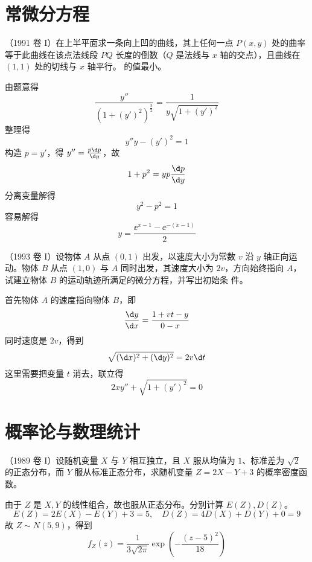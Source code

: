 \section{常微分方程}

\begin{problem}[000061]
（1991 卷 I）在上半平面求一条向上凹的曲线，其上任何一点 $P(x, y)$ 处的曲率等于此曲线在该点法线段 $PQ$ 长度的倒数（$Q$ 是法线与 $x$ 轴的交点），且曲线在 $(1, 1)$ 处的切线与 $x$ 轴平行。
的值最小。
\end{problem}

\begin{solution}
	由题意得
	\[ \frac{y''}{(1+(y')^2)^{\frac{3}{2}}} = \frac{1}{y \sqrt{1 + (y')^2}} \]
	整理得
	\[ y'' y - (y')^2 = 1 \]
	构造 $p = y'$，得 $y'' = \frac{p \d p}{\d y}$，故
	\[ 1 + p^2 = yp \frac{\d p}{\d y} \]
	分离变量解得
	\[ y^2 - p^2 = 1 \]
	容易解得
	\[ y = \frac{\ee^{x-1} - \ee^{-(x-1)}}{2} \]
\end{solution}

\begin{problem}[000063]
（1993 卷 I）设物体 $A$ 从点 $(0,1)$ 出发，以速度大小为常数 $v$ 沿 $y$ 轴正向运动。物体 $B$ 从点 $(1,0)$ 与 $A$ 同时出发，其速度大小为 $2v$，方向始终指向 $A$，试建立物体 $B$ 的运动轨迹所满足的微分方程，并写出初始条
件。
\end{problem}

\begin{solution}
	首先物体 $A$ 的速度指向物体 $B$，即
	\[ \frac{\d y}{\d x} = \frac{1 + vt - y}{0 - x} \]
	同时速度是 $2v$，得到
	\[ \sqrt{(\d x)^2 + (\d y)^2} = 2 v \d t \]
	这里需要把变量 $t$ 消去，联立得
	\[ 2 x y'' + \sqrt{1 + (y')^2} = 0 \]
\end{solution}

\section{概率论与数理统计}

\begin{problem}[000062]
（1989 卷 I）设随机变量 $X$ 与 $Y$ 相互独立，且 $X$ 服从均值为 $1$、标准差为 $\sqrt{2}$ 的正态分布，而 $Y$ 服从标准正态分布，求随机变量 $Z = 2X - Y + 3$ 的概率密度函数。
\end{problem}

\begin{solution}
	由于 $Z$ 是 $X, Y$ 的线性组合，故也服从正态分布。分别计算 $E(Z), D(Z)$。
	\[ E(Z) = 2 E(X) - E(Y) + 3 = 5, \quad D(Z) = 4D(X) + D(Y) + 0 = 9 \]
	故 $Z \sim N(5, 9)$，得到
	\[ f_Z(z) = \frac{1}{3 \sqrt{2 \pi}} \exp\left(- \frac{(z-5)^2}{18 }\right) \]
\end{solution}
